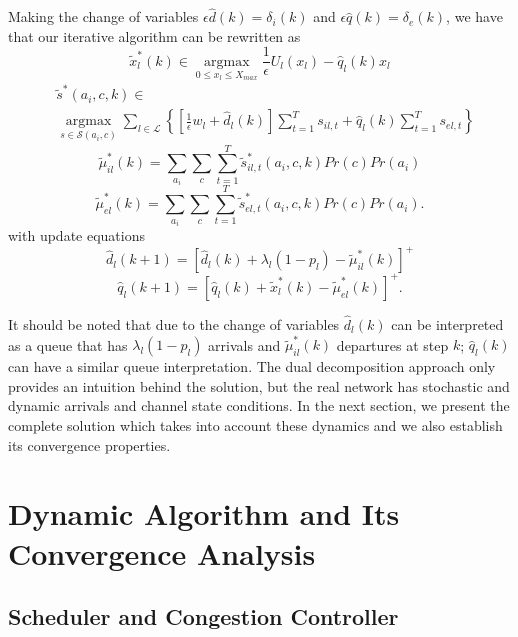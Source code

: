 \documentclass[conference]{IEEEtran}
\begin{document}
Making the change of variables $\epsilon \hat{d}(k) = \delta_i(k)$ and $\epsilon \hat{q}(k) = \delta_e(k)$, we have that our iterative algorithm can be rewritten as
\begin{equation*}
	\tilde{x}_l^*(k) \in \mathop{\arg\max}\limits_{ 0 \leq x_l \leq X_{max} } \frac{1}{\epsilon} U_l(x_l) - \hat{q}_l(k) x_l
\end{equation*}
\begin{align*}
	& \tilde{s}^*(a_i,c,k) \in \\
	& \mathop{\arg\max}\limits_{s \in \mathcal{S}(a_i,c)} \sum\limits_{l \in \mathcal{L}} \left\{ [\frac{1}{\epsilon} w_l+\hat{d}_l(k)] \sum_{t=1}^{T} s_{il,t}  + \hat{q}_l(k) \sum_{t=1}^{T} s_{el,t} \right\}
\end{align*}
\begin{equation*}
	\tilde{\mu}_{il}^*(k) = \sum\limits_{a_i} \sum\limits_{c} \sum_{t=1}^{T} \tilde{s}_{il,t}^*(a_i, c, k) Pr(c) Pr(a_i)
\end{equation*}
\begin{equation*}
	\tilde{\mu}_{el}^*(k) = \sum\limits_{a_i} \sum\limits_{c} \sum_{t=1}^{T} \tilde{s}_{el,t}^*(a_i, c, k) Pr(c) Pr(a_i).
\end{equation*}
with update equations
\begin{equation*}
	\hat{d}_l(k+1) = [ \hat{d}_l(k) + \lambda_l(1-p_l) - \tilde{\mu}_{il}^*(k)]^+
\end{equation*}
\begin{equation*}
	\hat{q}_l(k+1) = [ \hat{q}_l(k) + \tilde{x}_l^*(k) - \tilde{\mu}_{el}^*(k) ]^+.
\end{equation*}

It should be noted that due to the change of variables $\hat{d}_l(k)$ can be interpreted as a queue that has $\lambda_l(1-p_l)$ arrivals and $\tilde{\mu}_{il}^*(k)$ departures at step $k$; $\hat{q}_l(k)$ can have a similar queue interpretation. The dual decomposition approach only provides an intuition behind the solution, but the real network has stochastic and dynamic arrivals and channel state conditions. In the next section, we present the complete solution which takes into account these dynamics and we also establish its convergence properties.

\section{Dynamic Algorithm and Its Convergence Analysis}
\subsection{Scheduler and Congestion Controller}
\label{online_kc}
\end{document}
